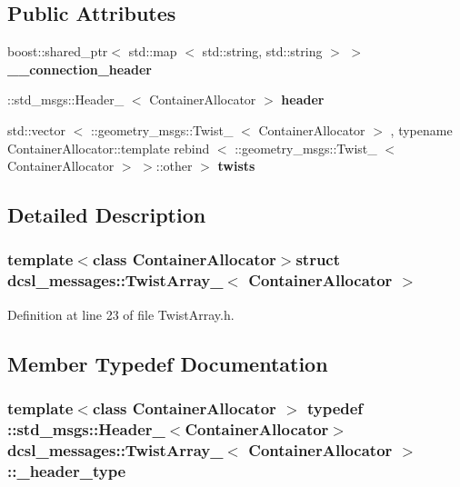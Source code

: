 \subsection*{\-Public \-Attributes}
\begin{DoxyCompactItemize}
\item 
boost\-::shared\-\_\-ptr$<$ std\-::map\*
$<$ std\-::string, std\-::string $>$ $>$ {\bf \-\_\-\-\_\-connection\-\_\-header}
\item 
\-::std\-\_\-msgs\-::\-Header\-\_\-\*
$<$ \-Container\-Allocator $>$ {\bf header}
\item 
std\-::vector\*
$<$ \-::geometry\-\_\-msgs\-::\-Twist\-\_\-\*
$<$ \-Container\-Allocator $>$\*
, typename \*
\-Container\-Allocator\-::template \*
rebind\*
$<$ \-::geometry\-\_\-msgs\-::\-Twist\-\_\-\*
$<$ \-Container\-Allocator $>$\*
 $>$\-::other $>$ {\bf twists}
\end{DoxyCompactItemize}


\subsection{\-Detailed \-Description}
\subsubsection*{template$<$class Container\-Allocator$>$struct dcsl\-\_\-messages\-::\-Twist\-Array\-\_\-$<$ Container\-Allocator $>$}



\-Definition at line 23 of file \-Twist\-Array.\-h.



\subsection{\-Member \-Typedef \-Documentation}
\subsubsection[{\-\_\-header\-\_\-type}]{\setlength{\rightskip}{0pt plus 5cm}template$<$class Container\-Allocator $>$ typedef \-::std\-\_\-msgs\-::\-Header\-\_\-$<$\-Container\-Allocator$>$ {\bf dcsl\-\_\-messages\-::\-Twist\-Array\-\_\-}$<$ \-Container\-Allocator $>$\-::{\bf \-\_\-header\-\_\-type}}\label{structdcsl__messages_1_1TwistArray___a8084ea435deccbfe8c3d67ac1c891e43}


